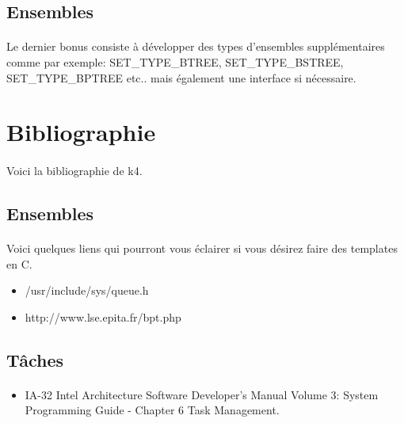 \documentclass[10pt,a4wide]{article}
\begin{document}
\subsection{Ensembles}

\paragraph{}

Le dernier bonus consiste \`a d\'evelopper des types d'ensembles
suppl\'ementaires comme par exemple: SET\_TYPE\_BTREE, SET\_TYPE\_BSTREE,
SET\_TYPE\_BPTREE etc.. mais \'egalement une interface si n\'ecessaire.

\section{Bibliographie}

\paragraph{}

Voici la bibliographie de k4.

\subsection{Ensembles}

\paragraph{}

Voici quelques liens qui pourront vous \'eclairer si vous d\'esirez
faire des templates en C.

\begin{itemize}
\item /usr/include/sys/queue.h
\item http://www.lse.epita.fr/bpt.php
\end{itemize}

\subsection{T\^aches}

\paragraph{}

\begin{itemize}
\item IA-32 Intel Architecture Software Developer's Manual Volume 3:
      System Programming Guide - Chapter 6 Task Management.
\end{itemize}
\end{document}
